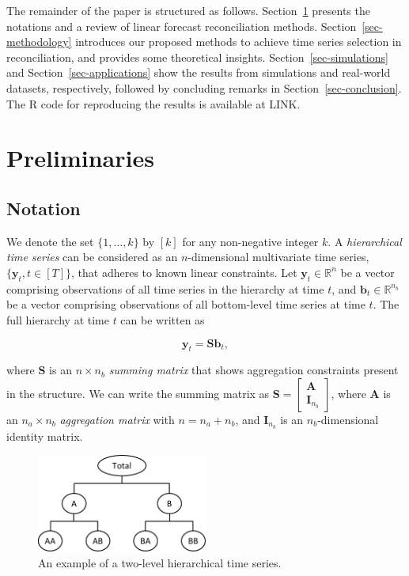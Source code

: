 \documentclass[11pt,a4paper,]{article}
\begin{document}
The remainder of the paper is structured as follows.
Section~\ref{sec-preliminaries} presents the notations and a review of
linear forecast reconciliation methods. Section~\ref{sec-methodology}
introduces our proposed methods to achieve time series selection in
reconciliation, and provides some theoretical insights.
Section~\ref{sec-simulations} and Section~\ref{sec-applications} show
the results from simulations and real-world datasets, respectively,
followed by concluding remarks in Section~\ref{sec-conclusion}. The R
code for reproducing the results is available at LINK.

\hypertarget{sec-preliminaries}{%
\section{Preliminaries}\label{sec-preliminaries}}

\hypertarget{notation}{%
\subsection{Notation}\label{notation}}

We denote the set \(\{1,\ldots,k\}\) by \([k]\) for any non-negative
integer \(k\). A \emph{hierarchical time series} can be considered as an
\(n\)-dimensional multivariate time series,
\(\{\boldsymbol{y}_t, t \in [T]\}\), that adheres to known linear
constraints. Let \(\boldsymbol{y}_t \in \mathbb{R}^n\) be a vector
comprising observations of all time series in the hierarchy at time
\(t\), and \(\boldsymbol{b}_t \in \mathbb{R}^{n_b}\) be a vector
comprising observations of all bottom-level time series at time \(t\).
The full hierarchy at time \(t\) can be written as

\[
\boldsymbol{y}_t = \boldsymbol{S}\boldsymbol{b}_t,
\]

where \(\boldsymbol{S}\) is an \(n \times n_b\) \emph{summing matrix}
that shows aggregation constraints present in the structure. We can
write the summing matrix as
\(\boldsymbol{S} = \left[\begin{array}{c}\boldsymbol{A} \\ \boldsymbol{I}_{n_b}\end{array}\right]\),
where \(\boldsymbol{A}\) is an \(n_a \times n_b\) \emph{aggregation
matrix} with \(n = n_a + n_b\), and \(\boldsymbol{I}_{n_b}\) is an
\(n_b\)-dimensional identity matrix.

\begin{figure}

{\centering \includegraphics[width=0.5\textwidth,height=\textheight]{figs/hts_example.pdf}

}

\caption{\label{fig-hts}An example of a two-level hierarchical time
series.}

\end{figure}
\end{document}
